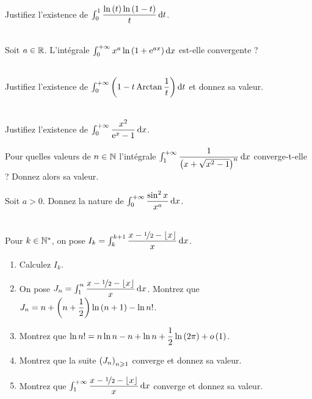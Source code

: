 \begin{exo}~\\
Justifiez l'existence de \(\int_0^1\dfrac{\ln\paren{t}\ln\paren{1-t}}{t}\odif{t}\).
\end{exo}

\begin{exo}~\\
Soit \(a\in\mathbb{R}\). L'intégrale \(\int_0^{\pinf}x^a\ln\paren{1+\e{ax}}\odif{x}\) est-elle convergente ?
\end{exo}

\begin{exo}~\\
Justifiez l'existence de \(\int_0^{\pinf}\paren{1-t\Arctan\dfrac{1}{t}}\odif{t}\) et donnez sa valeur.
\end{exo}

\begin{exo}~\\
Justifiez l'existence de \(\int_0^{\pinf}\dfrac{x^2}{\e{x}-1}\odif{x}\).
\end{exo}

\begin{exo}
Pour quelles valeurs de \(n\in\mathbb{N}\) l'intégrale \(\int_1^{\pinf}\dfrac{1}{\paren{x+\sqrt{x^2-1}}^n}\odif{x}\) converge-t-elle ? Donnez alors sa valeur.
\end{exo}

\begin{exo}
Soit \(a>0\). Donnez la nature de \(\int_0^{\pinf}\dfrac{\sin^2x}{x^a}\odif{x}\).
\end{exo}

\begin{exo}~\\
Pour \(k\in\mathbb{N}^*\), on pose \(I_k=\int_k^{k+1}\dfrac{x-\nicefrac{1}{2}-\floor{x}}{x}\odif{x}\).

\begin{enumerate}
    \item Calculez \(I_k\). \\
    \item On pose \(J_n=\int_1^n\dfrac{x-\nicefrac{1}{2}-\floor{x}}{x}\odif{x}\). Montrez que \(J_n=n+\left(n+\dfrac{1}{2}\right)\ln\left(n+1\right)-\ln n!\). \\
    \item Montrez que \(\ln n!=n\ln n-n+\ln n+\dfrac{1}{2}\ln\left(2\pi\right)+o\left(1\right)\). \\
    \item Montrez que la suite \(\left(J_n\right)_{n\geqslant1}\) converge et donnez sa valeur. \\
    \item Montrez que \(\int_1^{\pinf}\dfrac{x-\nicefrac{1}{2}-\floor{x}}{x}\odif{x}\) converge et donnez sa valeur.
\end{enumerate}
\end{exo}

